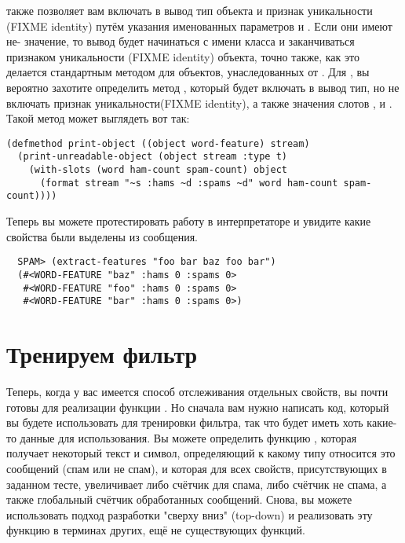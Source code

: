  также позволяет вам включать в вывод тип объекта и признак
уникальности (FIXME identity) путём указания именованных параметров  и
.  Если они имеют не- значение, то вывод будет начинаться с имени
класса и заканчиваться признаком уникальности (FIXME identity) объекта, точно также, как
это делается стандартным методом  для объектов, унаследованных от
.  Для , вы вероятно захотите определить метод
, который будет включать в вывод тип, но не включать признак
уникальности(FIXME identity), а также значения слотов ,  и
.  Такой метод может выглядеть вот так:

\begin{lstlisting}
(defmethod print-object ((object word-feature) stream)
  (print-unreadable-object (object stream :type t)
    (with-slots (word ham-count spam-count) object
      (format stream "~s :hams ~d :spams ~d" word ham-count spam-count))))
\end{lstlisting}

Теперь вы можете протестировать работу  в интерпретаторе и увидите
какие свойства были выделены из сообщения.

\begin{verbatim}
  SPAM> (extract-features "foo bar baz foo bar")
  (#<WORD-FEATURE "baz" :hams 0 :spams 0>
   #<WORD-FEATURE "foo" :hams 0 :spams 0>
   #<WORD-FEATURE "bar" :hams 0 :spams 0>)
\end{verbatim}

\section{Тренируем фильтр}

Теперь, когда у вас имеется способ отслеживания отдельных свойств, вы почти готовы для
реализации функции .  Но сначала вам нужно написать код, который вы будете
использовать для тренировки фильтра, так что  будет иметь хоть какие-то данные
для использования.  Вы можете определить функцию , которая получает некоторый
текст и символ, определяющий к какому типу относится это сообщений (спам или не спам), и
которая для всех свойств, присутствующих в заданном тесте, увеличивает либо счётчик для
спама, либо счётчик не спама, а также глобальный счётчик обработанных сообщений.  Снова,
вы можете использовать подход разработки "сверху вниз" (top-down) и реализовать эту
функцию в терминах других, ещё не существующих функций.

